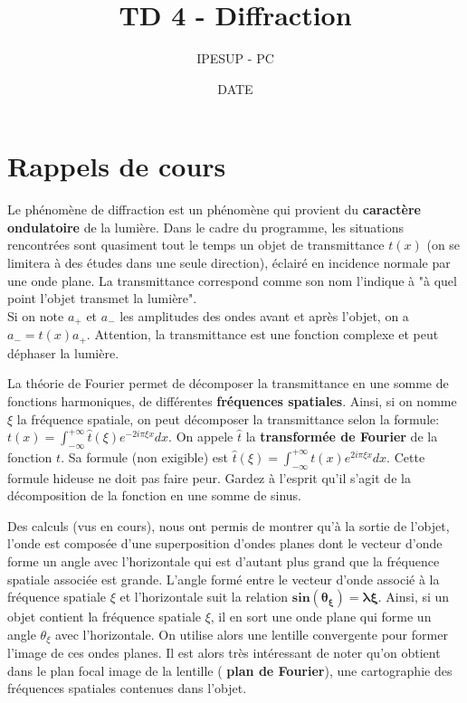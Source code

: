 \documentclass{article}
\title{TD 4 - Diffraction}
\author{IPESUP - PC }
\date{DATE}
\begin{document}
\maketitle

\section{Rappels de cours}

Le phénomène de diffraction est un phénomène qui provient du \textbf{caractère ondulatoire } de la lumière. 
Dans le cadre du programme, les situations rencontrées sont quasiment tout le temps un objet de transmittance $t(x)$ (on se limitera à des études dans une seule direction), éclairé en incidence normale par une onde plane.
La transmittance correspond comme son nom l'indique à "à quel point l'objet transmet la lumière".\\
Si on note $a_+$ et $a_-$ les amplitudes des ondes avant et après l'objet, on a $a_- = t(x) a_+$.
Attention, la transmittance est une fonction complexe et peut déphaser la lumière. 

La théorie de Fourier permet de décomposer la transmittance en une somme de fonctions harmoniques, de différentes \textbf{fréquences spatiales}. 
Ainsi, si on nomme $\xi$ la fréquence spatiale, on peut décomposer la transmittance selon la formule: $t(x) = \int_{- \infty}^{+ \infty} \hat{t}(\xi) e^{-2i \pi\xi x} dx$.
On appele $\hat{t}$ la \textbf{transformée de Fourier} de la fonction $t$.
Sa formule (non exigible) est $\hat{t}(\xi) = \int_{- \infty}^{+ \infty} t(x) e^{2i \pi \xi x} dx$.
Cette formule hideuse ne doit pas faire peur. Gardez à l'esprit qu'il s'agit de la décomposition de la fonction en une somme de sinus. 

Des calculs (vus en cours), nous ont permis de montrer qu'à la sortie de l'objet, l'onde est composée d'une superposition d'ondes planes dont le vecteur d'onde forme un angle avec l'horizontale qui est d'autant plus grand que la fréquence spatiale associée est grande.
L'angle formé entre le vecteur d'onde associé à la fréquence spatiale $\xi$ et l'horizontale suit la relation $\boldsymbol{ sin(\theta_\xi) = \lambda \xi}. $
Ainsi, si un objet contient la fréquence spatiale $\xi$, il en sort une onde plane qui forme un angle $\theta_\xi$ avec l'horizontale.
On utilise alors une lentille convergente pour former l'image de ces ondes planes. 
Il est alors très intéressant de noter qu'on obtient dans le plan focal image de la lentille ( \textbf{plan de Fourier}), une cartographie des fréquences spatiales contenues dans l'objet.
\end{document}
